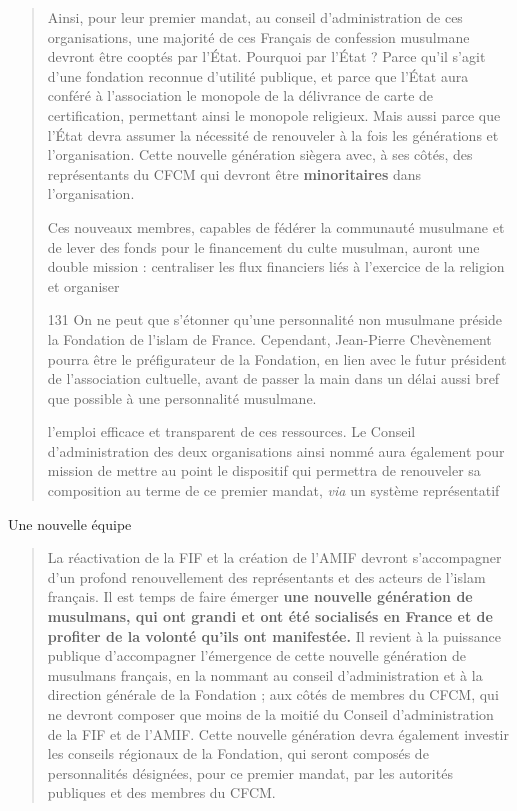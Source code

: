 \begin{quote}
Ainsi, pour leur premier mandat, au conseil d'administration de ces
organisations, une majorité de ces Français de confession musulmane
devront être cooptés par l'État. Pourquoi par l'État ? Parce qu'il
s'agit d'une fondation reconnue d'utilité publique, et parce que l'État
aura conféré à l'association le monopole de la délivrance de carte de
certification, permettant ainsi le monopole religieux. Mais aussi parce
que l'État devra assumer la nécessité de renouveler à la fois les
générations et l'organisation. Cette nouvelle génération siègera avec, à
ses côtés, des représentants du CFCM qui devront être
\textbf{minoritaires} dans l'organisation.

Ces nouveaux membres, capables de fédérer la communauté musulmane et de
lever des fonds pour le financement du culte musulman, auront une double
mission : centraliser les flux financiers liés à l'exercice de la
religion et organiser

131 On ne peut que s'étonner qu'une personnalité non musulmane préside
la Fondation de l'islam de France. Cependant, Jean-Pierre Chevènement
pourra être le préfigurateur de la Fondation, en lien avec le futur
président de l'association cultuelle, avant de passer la main dans un
délai aussi bref que possible à une personnalité musulmane.



l'emploi efficace et transparent de ces ressources. Le Conseil
d'administration des deux organisations ainsi nommé aura également pour
mission de mettre au point le dispositif qui permettra de renouveler sa
composition au terme de ce premier mandat, \emph{via} un système
représentatif
\end{quote}

Une nouvelle équipe

\begin{quote}
La réactivation de la FIF et la création de l'AMIF devront s'accompagner
d'un profond renouvellement des représentants et des acteurs de l'islam
français. Il est temps de faire émerger \textbf{une nouvelle génération
de musulmans, qui ont grandi et ont été socialisés en France et de
profiter de la volonté qu'ils ont manifestée.} Il revient à la puissance
publique d'accompagner l'émergence de cette nouvelle génération de
musulmans français, en la nommant au conseil d'administration et à la
direction générale de la Fondation ; aux côtés de membres du CFCM, qui
ne devront composer que moins de la moitié du Conseil d'administration
de la FIF et de l'AMIF. Cette nouvelle génération devra également
investir les conseils régionaux de la Fondation, qui seront composés de
personnalités désignées, pour ce premier mandat, par les autorités
publiques et des membres du CFCM.
\end{quote}

